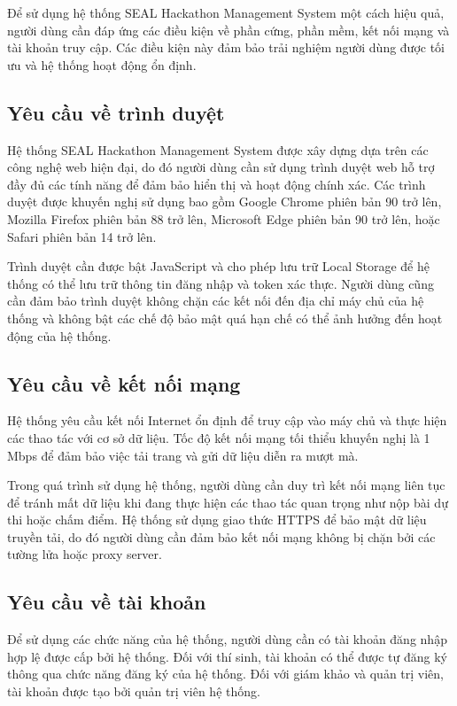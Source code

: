Để sử dụng hệ thống SEAL Hackathon Management System một cách hiệu quả, người dùng cần đáp ứng các điều kiện về phần cứng, phần mềm, kết nối mạng và tài khoản truy cập. Các điều kiện này đảm bảo trải nghiệm người dùng được tối ưu và hệ thống hoạt động ổn định.

\subsection{Yêu cầu về trình duyệt}

Hệ thống SEAL Hackathon Management System được xây dựng dựa trên các công nghệ web hiện đại, do đó người dùng cần sử dụng trình duyệt web hỗ trợ đầy đủ các tính năng để đảm bảo hiển thị và hoạt động chính xác. Các trình duyệt được khuyến nghị sử dụng bao gồm Google Chrome phiên bản 90 trở lên, Mozilla Firefox phiên bản 88 trở lên, Microsoft Edge phiên bản 90 trở lên, hoặc Safari phiên bản 14 trở lên.

Trình duyệt cần được bật JavaScript và cho phép lưu trữ Local Storage để hệ thống có thể lưu trữ thông tin đăng nhập và token xác thực. Người dùng cũng cần đảm bảo trình duyệt không chặn các kết nối đến địa chỉ máy chủ của hệ thống và không bật các chế độ bảo mật quá hạn chế có thể ảnh hưởng đến hoạt động của hệ thống.

\subsection{Yêu cầu về kết nối mạng}

Hệ thống yêu cầu kết nối Internet ổn định để truy cập vào máy chủ và thực hiện các thao tác với cơ sở dữ liệu. Tốc độ kết nối mạng tối thiểu khuyến nghị là 1 Mbps để đảm bảo việc tải trang và gửi dữ liệu diễn ra mượt mà.

Trong quá trình sử dụng hệ thống, người dùng cần duy trì kết nối mạng liên tục để tránh mất dữ liệu khi đang thực hiện các thao tác quan trọng như nộp bài dự thi hoặc chấm điểm. Hệ thống sử dụng giao thức HTTPS để bảo mật dữ liệu truyền tải, do đó người dùng cần đảm bảo kết nối mạng không bị chặn bởi các tường lửa hoặc proxy server.

\subsection{Yêu cầu về tài khoản}

Để sử dụng các chức năng của hệ thống, người dùng cần có tài khoản đăng nhập hợp lệ được cấp bởi hệ thống. Đối với thí sinh, tài khoản có thể được tự đăng ký thông qua chức năng đăng ký của hệ thống. Đối với giám khảo và quản trị viên, tài khoản được tạo bởi quản trị viên hệ thống.

